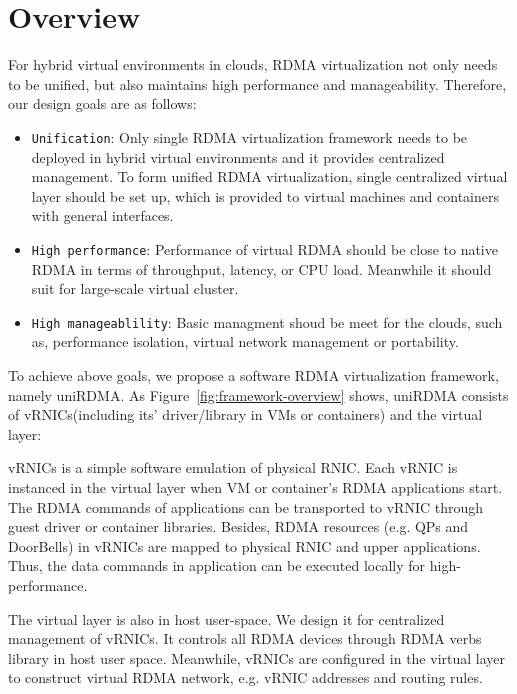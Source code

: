 \section{Overview}

For hybrid virtual environments in clouds, RDMA virtualization not only needs to be unified, but also maintains high performance and manageability. Therefore, our design goals are as follows:

\begin{itemize}
	\item {\verb|Unification|}: Only single RDMA virtualization framework needs to be deployed in hybrid virtual environments and it provides centralized management.
	To form unified RDMA virtualization, single centralized virtual layer should be set up, which is provided to virtual machines and containers with general interfaces.
	\item {\verb|High performance|}: Performance of virtual RDMA should be close to native RDMA in terms of throughput, latency, or CPU load. Meanwhile it should suit for large-scale virtual cluster.
	\item {\verb|High manageablility|}: Basic managment shoud be meet for the clouds, such as, performance isolation, virtual network management or  portability.
\end{itemize}

To achieve above goals, we propose a software RDMA virtualization framework, namely uniRDMA. As Figure~\ref{fig:framework-overview} shows, uniRDMA consists of vRNICs(including its' driver/library in VMs or containers) and the virtual layer:

vRNICs is a simple software emulation of physical RNIC. Each vRNIC is instanced in the virtual layer when VM or container's RDMA applications start. The RDMA commands of applications can be transported to vRNIC through guest driver or container libraries. Besides, RDMA resources (e.g. QPs and DoorBells) in vRNICs are mapped to physical RNIC and upper applications. Thus, the data commands in application can be executed locally for high-performance.

The virtual layer is also in host user-space. We design it for centralized management of vRNICs. It controls all RDMA devices through RDMA verbs library in host user space. Meanwhile, vRNICs are configured in the virtual layer to construct virtual RDMA network, e.g. vRNIC addresses and routing rules.

